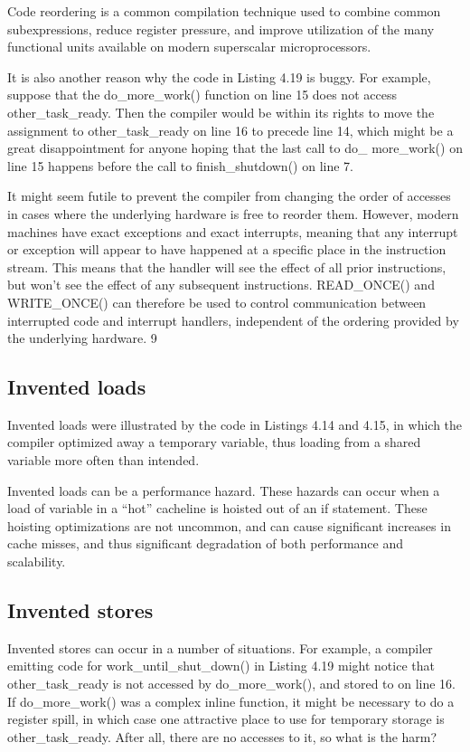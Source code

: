 Code reordering is a common compilation technique used to combine
common subexpressions, reduce register pressure, and improve utilization of
the many functional units available on modern superscalar microprocessors.

It is also another reason why the code in Listing 4.19 is buggy. For example,
suppose that the do\_more\_work() function on line 15 does not access
other\_task\_ready. Then the compiler would be within its rights to move
the assignment to other\_task\_ready on line 16 to precede line 14, which
might be a great disappointment for anyone hoping that the last call to do\_
more\_work() on line 15 happens before the call to finish\_shutdown()
on line 7.

It might seem futile to prevent the compiler from changing the order of
accesses in cases where the underlying hardware is free to reorder them.
However, modern machines have exact exceptions and exact interrupts,
meaning that any interrupt or exception will appear to have happened at a
specific place in the instruction stream. This means that the handler will see
the effect of all prior instructions, but won’t see the effect of any subsequent
instructions. READ\_ONCE() and WRITE\_ONCE() can therefore be used to
control communication between interrupted code and interrupt handlers,
independent of the ordering provided by the underlying hardware. 9


\subsection{Invented loads}
Invented loads were illustrated by the code in Listings 4.14 and 4.15, in
which the compiler optimized away a temporary variable, thus loading from
a shared variable more often than intended.

Invented loads can be a performance hazard. These hazards can occur
when a load of variable in a “hot” cacheline is hoisted out of an if
statement. These hoisting optimizations are not uncommon, and can cause
significant increases in cache misses, and thus significant degradation of
both performance and scalability.

\subsection{Invented stores}

Invented stores can occur in a number of situations. For example,
a compiler emitting code for work\_until\_shut\_down() in Listing 4.19
might notice that other\_task\_ready is not accessed by do\_more\_work(),
and stored to on line 16. If do\_more\_work() was a complex inline function,
it might be necessary to do a register spill, in which case one attractive place
to use for temporary storage is other\_task\_ready. After all, there are no
accesses to it, so what is the harm?

